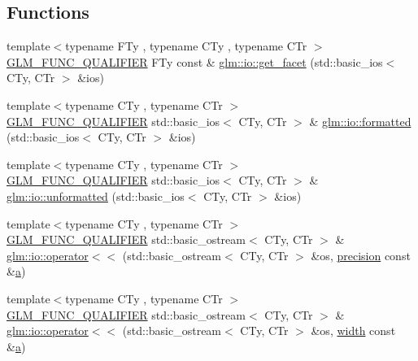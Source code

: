 \subsection*{Functions}
\begin{DoxyCompactItemize}
\item 
{\footnotesize template$<$typename F\+Ty , typename C\+Ty , typename C\+Tr $>$ }\\\hyperlink{setup_8hpp_a33fdea6f91c5f834105f7415e2a64407}{G\+L\+M\+\_\+\+F\+U\+N\+C\+\_\+\+Q\+U\+A\+L\+I\+F\+I\+ER} F\+Ty const  \& \hyperlink{namespaceglm_1_1io_a9e8927cf032254b0eee4ec650286e1f9}{glm\+::io\+::get\+\_\+facet} (std\+::basic\+\_\+ios$<$ C\+Ty, C\+Tr $>$ \&ios)
\item 
{\footnotesize template$<$typename C\+Ty , typename C\+Tr $>$ }\\\hyperlink{setup_8hpp_a33fdea6f91c5f834105f7415e2a64407}{G\+L\+M\+\_\+\+F\+U\+N\+C\+\_\+\+Q\+U\+A\+L\+I\+F\+I\+ER} std\+::basic\+\_\+ios$<$ C\+Ty, C\+Tr $>$ \& \hyperlink{namespaceglm_1_1io_aa31ec433f6039e5bd35f0f58b37bef83}{glm\+::io\+::formatted} (std\+::basic\+\_\+ios$<$ C\+Ty, C\+Tr $>$ \&ios)
\item 
{\footnotesize template$<$typename C\+Ty , typename C\+Tr $>$ }\\\hyperlink{setup_8hpp_a33fdea6f91c5f834105f7415e2a64407}{G\+L\+M\+\_\+\+F\+U\+N\+C\+\_\+\+Q\+U\+A\+L\+I\+F\+I\+ER} std\+::basic\+\_\+ios$<$ C\+Ty, C\+Tr $>$ \& \hyperlink{namespaceglm_1_1io_a8f950faa7ad67cac1287beaf896a8bb6}{glm\+::io\+::unformatted} (std\+::basic\+\_\+ios$<$ C\+Ty, C\+Tr $>$ \&ios)
\item 
{\footnotesize template$<$typename C\+Ty , typename C\+Tr $>$ }\\\hyperlink{setup_8hpp_a33fdea6f91c5f834105f7415e2a64407}{G\+L\+M\+\_\+\+F\+U\+N\+C\+\_\+\+Q\+U\+A\+L\+I\+F\+I\+ER} std\+::basic\+\_\+ostream$<$ C\+Ty, C\+Tr $>$ \& \hyperlink{namespaceglm_1_1io_ac52a8c5f8ea189f5bae2e5b8e382675f}{glm\+::io\+::operator$<$$<$} (std\+::basic\+\_\+ostream$<$ C\+Ty, C\+Tr $>$ \&os, \hyperlink{_s_d_l__opengl__glext_8h_ae6165268264b393d031f89082216499d}{precision} const \&\hyperlink{_s_d_l__opengl__glext_8h_a3309789fc188587d666cda5ece79cf82}{a})
\item 
{\footnotesize template$<$typename C\+Ty , typename C\+Tr $>$ }\\\hyperlink{setup_8hpp_a33fdea6f91c5f834105f7415e2a64407}{G\+L\+M\+\_\+\+F\+U\+N\+C\+\_\+\+Q\+U\+A\+L\+I\+F\+I\+ER} std\+::basic\+\_\+ostream$<$ C\+Ty, C\+Tr $>$ \& \hyperlink{namespaceglm_1_1io_ac4783e4e3b0384619625d5d2d00c27b8}{glm\+::io\+::operator$<$$<$} (std\+::basic\+\_\+ostream$<$ C\+Ty, C\+Tr $>$ \&os, \hyperlink{_s_d_l__opengl_8h_a9a82cf3caff84cabc4598e2619faac17}{width} const \&\hyperlink{_s_d_l__opengl__glext_8h_a3309789fc188587d666cda5ece79cf82}{a})

\end{DoxyCompactItemize}
